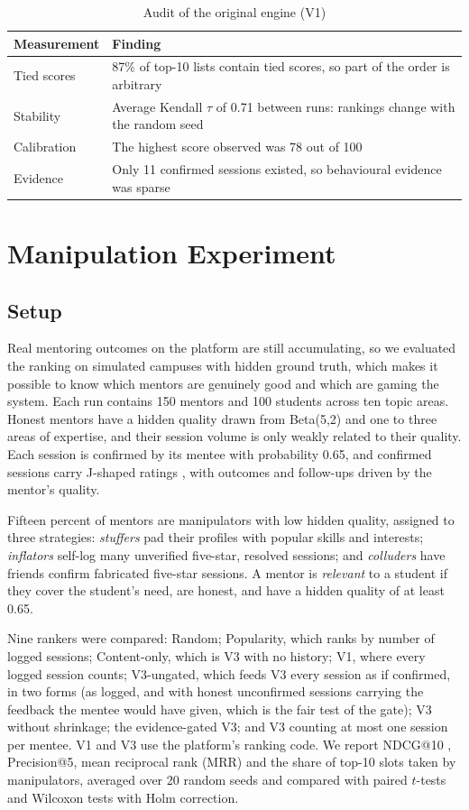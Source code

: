 \documentclass[12pt,a4paper]{report}
\begin{document}
\begin{table}[h]
\centering
\caption{Audit of the original engine (V1)}
\label{tab:audit}
\small
\begin{tabularx}{\textwidth}{>{\raggedright\arraybackslash}p{3.2cm}X}
\toprule
\textbf{Measurement} & \textbf{Finding}\\
\midrule
Tied scores & 87\% of top-10 lists contain tied scores, so part of the order is arbitrary\\
Stability & Average Kendall $\tau$ of 0.71 between runs: rankings change with the random seed\\
Calibration & The highest score observed was 78 out of 100\\
Evidence & Only 11 confirmed sessions existed, so behavioural evidence was sparse\\
\bottomrule
\end{tabularx}
\end{table}

\section{Manipulation Experiment}
\subsection{Setup}
Real mentoring outcomes on the platform are still accumulating, so we evaluated the ranking on simulated campuses with hidden ground truth, which makes it possible to know which mentors are genuinely good and which are gaming the system. Each run contains 150 mentors and 100 students across ten topic areas. Honest mentors have a hidden quality drawn from Beta(5,2) and one to three areas of expertise, and their session volume is only weakly related to their quality. Each session is confirmed by its mentee with probability 0.65, and confirmed sessions carry J-shaped ratings \cite{hu2006}, with outcomes and follow-ups driven by the mentor's quality.

Fifteen percent of mentors are manipulators with low hidden quality, assigned to three strategies: \emph{stuffers} pad their profiles with popular skills and interests; \emph{inflators} self-log many unverified five-star, resolved sessions; and \emph{colluders} have friends confirm fabricated five-star sessions. A mentor is \emph{relevant} to a student if they cover the student's need, are honest, and have a hidden quality of at least 0.65.

Nine rankers were compared: Random; Popularity, which ranks by number of logged sessions; Content-only, which is V3 with no history; V1, where every logged session counts; V3-ungated, which feeds V3 every session as if confirmed, in two forms (as logged, and with honest unconfirmed sessions carrying the feedback the mentee would have given, which is the fair test of the gate); V3 without shrinkage; the evidence-gated V3; and V3 counting at most one session per mentee. V1 and V3 use the platform's ranking code. We report NDCG@10 \cite{jarvelin2002}, Precision@5, mean reciprocal rank (MRR) and the share of top-10 slots taken by manipulators, averaged over 20 random seeds and compared with paired $t$-tests and Wilcoxon tests with Holm correction.
\end{document}
